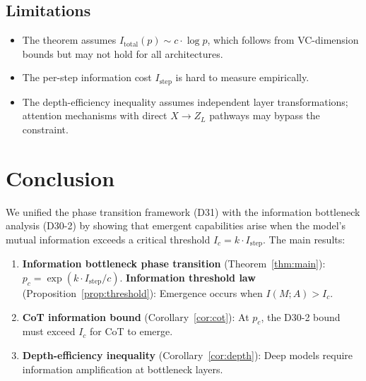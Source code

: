 \documentclass[12pt]{article}
\theoremstyle{definition}
\theoremstyle{remark}
\begin{document}
\subsection{Limitations}

\begin{itemize}
  \item The theorem assumes $I_{\mathrm{total}}(p) \sim c \cdot \log p$, which follows from VC-dimension bounds but may not hold for all architectures.
  \item The per-step information cost $I_{\mathrm{step}}$ is hard to measure empirically.
  \item The depth-efficiency inequality assumes independent layer transformations; attention mechanisms with direct $X \to Z_L$ pathways may bypass the constraint.
\end{itemize}

\section{Conclusion}

We unified the phase transition framework (D31) with the information bottleneck analysis (D30-2) by showing that emergent capabilities arise when the model's mutual information exceeds a critical threshold $I_c = k \cdot I_{\mathrm{step}}$. The main results:

\begin{enumerate}
  \item \textbf{Information bottleneck phase transition} (Theorem~\ref{thm:main}): $p_c = \exp(k \cdot I_{\mathrm{step}} / c)$.
  \textbf{Information threshold law} (Proposition~\ref{prop:threshold}): Emergence occurs when $I(M; A) > I_c$.
  \item \textbf{CoT information bound} (Corollary~\ref{cor:cot}): At $p_c$, the D30-2 bound must exceed $I_c$ for CoT to emerge.
  \item \textbf{Depth-efficiency inequality} (Corollary~\ref{cor:depth}): Deep models require information amplification at bottleneck layers.
\end{enumerate}
\end{document}
